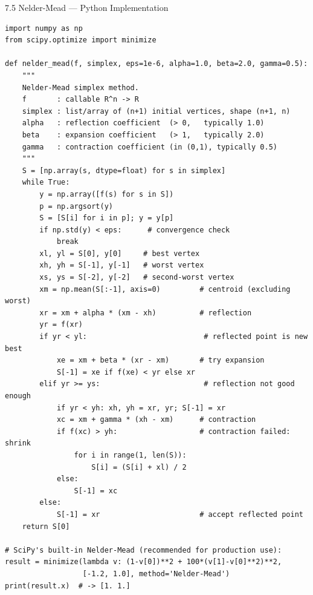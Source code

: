 \documentclass[aspectratio=169,10pt]{beamer}
\begin{document}
\begin{frame}[fragile]{7.5 Nelder-Mead --- Python Implementation}
\begin{lstlisting}[style=python, caption={Nelder-Mead simplex method (pure Python + SciPy)}]
import numpy as np
from scipy.optimize import minimize

def nelder_mead(f, simplex, eps=1e-6, alpha=1.0, beta=2.0, gamma=0.5):
    """
    Nelder-Mead simplex method.
    f       : callable R^n -> R
    simplex : list/array of (n+1) initial vertices, shape (n+1, n)
    alpha   : reflection coefficient  (> 0,   typically 1.0)
    beta    : expansion coefficient   (> 1,   typically 2.0)
    gamma   : contraction coefficient (in (0,1), typically 0.5)
    """
    S = [np.array(s, dtype=float) for s in simplex]
    while True:
        y = np.array([f(s) for s in S])
        p = np.argsort(y)
        S = [S[i] for i in p]; y = y[p]
        if np.std(y) < eps:      # convergence check
            break
        xl, yl = S[0], y[0]     # best vertex
        xh, yh = S[-1], y[-1]   # worst vertex
        xs, ys = S[-2], y[-2]   # second-worst vertex
        xm = np.mean(S[:-1], axis=0)         # centroid (excluding worst)
        xr = xm + alpha * (xm - xh)          # reflection
        yr = f(xr)
        if yr < yl:                           # reflected point is new best
            xe = xm + beta * (xr - xm)       # try expansion
            S[-1] = xe if f(xe) < yr else xr
        elif yr >= ys:                        # reflection not good enough
            if yr < yh: xh, yh = xr, yr; S[-1] = xr
            xc = xm + gamma * (xh - xm)      # contraction
            if f(xc) > yh:                   # contraction failed: shrink
                for i in range(1, len(S)):
                    S[i] = (S[i] + xl) / 2
            else:
                S[-1] = xc
        else:
            S[-1] = xr                       # accept reflected point
    return S[0]

# SciPy's built-in Nelder-Mead (recommended for production use):
result = minimize(lambda v: (1-v[0])**2 + 100*(v[1]-v[0]**2)**2,
                  [-1.2, 1.0], method='Nelder-Mead')
print(result.x)  # -> [1. 1.]
\end{lstlisting}
\end{frame}
\end{document}
